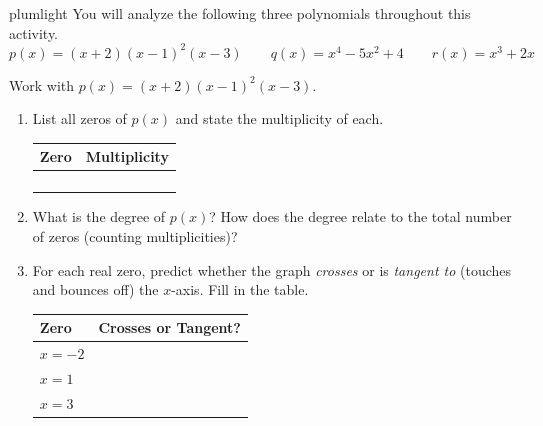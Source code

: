 \documentclass[10pt]{article}
\begin{document}
\namepartnerperiod

\vspace{0.1in}

\begin{scenariobox}{plumlight}
You will analyze the following three polynomials throughout this activity.
\[
  p(x)=(x+2)(x-1)^2(x-3) \qquad
  q(x)=x^4-5x^2+4 \qquad
  r(x)=x^3+2x
\]
\end{scenariobox}

\vspace{0.08in}

\begin{tcolorbox}[colback=white, colframe=black!40,
    title=\textbf{Tier R --- Remediate},
    fonttitle=\bfseries, arc=2mm, left=3mm, right=3mm, top=2mm, bottom=2mm]

Work with $p(x)=(x+2)(x-1)^2(x-3)$.

\begin{enumerate}[leftmargin=1.5em, itemsep=8pt]
  \item List all zeros of $p(x)$ and state the multiplicity of each.

  \renewcommand{\arraystretch}{1.6}
  \begin{tabularx}{\linewidth}{|X|X|}
  \hline
  \rowcolor{sky}
  \textbf{Zero} & \textbf{Multiplicity} \\
  \hline
  & \\
  \hline
  & \\
  \hline
  & \\
  \hline
  & \\
  \hline
  \end{tabularx}

  \item What is the degree of $p(x)$? \blank{2.5cm}
        How does the degree relate to the total number of zeros (counting multiplicities)?
        \writeline

  \item For each real zero, predict whether the graph \emph{crosses} or is \emph{tangent to}
        (touches and bounces off) the $x$-axis. Fill in the table.

  \begin{tabularx}{\linewidth}{|X|X|}
  \hline
  \rowcolor{sky}
  \textbf{Zero} & \textbf{Crosses or Tangent?} \\
  \hline
  $x=-2$ & \\[8pt]
  \hline
  $x=1$  & \\[8pt]
  \hline
  $x=3$  & \\[8pt]
  \hline
  \end{tabularx}

\end{enumerate}
\end{tcolorbox}
\end{document}
